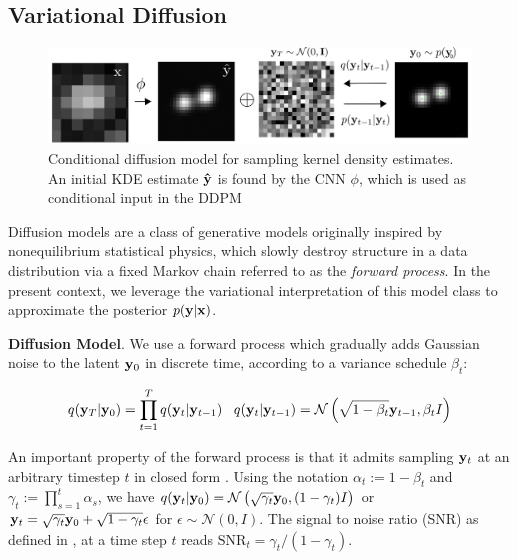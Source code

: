 \documentclass{article}
\begin{document}
\subsection{Variational Diffusion}

\begin{figure}
\includegraphics[scale=4.5]{media/Denoise.png}
\caption{Conditional diffusion model for sampling kernel density estimates. An initial KDE estimate $\bold{\hat{y}}$ is found by the CNN $\phi$, which is used as conditional input in the DDPM}
\end{figure}

Diffusion models \citep{SohlDickstein2015,Ho2020,Song2021} are a class of generative models originally inspired by nonequilibrium statistical physics, which slowly destroy structure in a data distribution via a fixed Markov chain referred to as the \emph{forward process}. In the present context, we leverage the variational interpretation of this model class \citep{Kingma2021,Kingma2023} to approximate the posterior $p(\bold{y}|\bold{x})$. 

\textbf{Diffusion Model}. We use a forward process which gradually adds Gaussian noise to the latent $\bold{y}_0$ in discrete time, according to a variance schedule $\beta_{t}$:

\begin{equation}
q(\bold{y}_{T}|\bold{y}_{0}) = \prod_{t=1}^{T}q(\bold{y}_{t}|\bold{y}_{t-1}) \;\;\; q(\bold{y}_{t}|\bold{y}_{t-1}) = \mathcal{N}\left(\sqrt{1-\beta_{t}}\bold{y}_{t-1},\beta_t I\right)
\end{equation}

An important property of the forward process is that it admits sampling $\bold{y}_t$ at an arbitrary timestep $t$ in closed form \citep{Ho2020}. Using the notation $\alpha_t := 1 - \beta_t$ and $\gamma_t := \prod_{s=1}^{t} \alpha_s$, we have $q(\bold{y}_t|\bold{y}_0) = \mathcal{N} \left(\sqrt{\gamma_{t}} \bold{y}_{0}, (1 - \gamma_t)I \right)$ or $\bold{y}_{t} = \sqrt{\gamma_{t}}\bold{y}_{0} + \sqrt{1-\gamma_{t}}\bold{\epsilon}$ for $\epsilon \sim \mathcal{N}(0,I)$. The signal to noise ratio (SNR) as defined in \citep{Kingma2023}, at a time step $t$ reads $\mathrm{SNR}_t = \gamma_{t}/(1-\gamma_{t})$.
\end{document}
